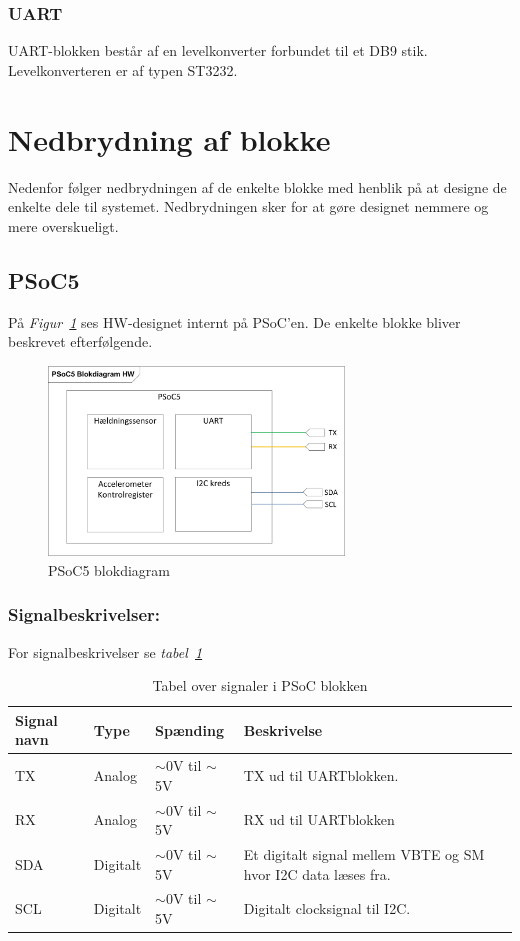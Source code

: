 \subsubsection{UART}
UART-blokken består af en levelkonverter forbundet til et DB9 stik. Levelkonverteren er af typen ST3232.
\section{Nedbrydning af blokke}
Nedenfor følger nedbrydningen af de enkelte blokke med henblik på at designe de enkelte dele til systemet. Nedbrydningen sker for at gøre designet nemmere og mere overskueligt.
\subsection{PSoC5}
På \textit{Figur~\ref{fig:HWPSoCSM}} ses  HW-designet internt på PSoC'en. De enkelte blokke bliver beskrevet efterfølgende.
\begin{figure}[H]
\centering
\includegraphics[width=0.7\textwidth]{billeder/SMPSoCblock}
\caption{PSoC5 blokdiagram}
\label{fig:HWPSoCSM}
\end{figure}
\subsubsection{Signalbeskrivelser:}
For signalbeskrivelser se \textit{tabel~\ref{table:PSoCSignalerSM}}
\begin{table}[H]
\begin{tabular}{|p{3cm}|p{3cm}|p{3cm}|p{4.5cm}|} \hline
\cellcolor[gray]{0.85}Signal navn& \cellcolor[gray]{0.85}Type &\cellcolor[gray]{0.85}Spænding&\cellcolor[gray]{0.85}Beskrivelse\\ \hline
TX & Analog & $\sim$0V til $\sim$5V & TX ud til UARTblokken.\\ \hline
RX & Analog & $\sim$0V til $\sim$5V & RX ud til UARTblokken \\ \hline
SDA & Digitalt & $\sim$0V til $\sim$5V & Et digitalt signal mellem VBTE og SM hvor I2C data læses fra.\\ \hline
SCL & Digitalt & $\sim$0V til $\sim$5V & Digitalt clocksignal til I2C.\\ \hline
\end{tabular}
\caption{Tabel over signaler i PSoC blokken}
\label{table:PSoCSignalerSM}
\end{table}
